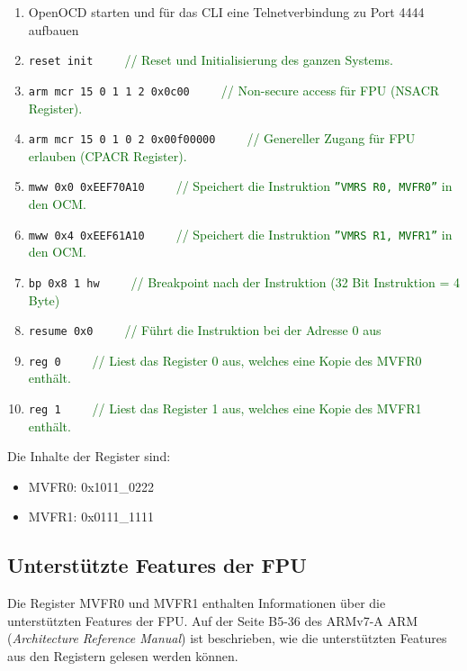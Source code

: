 \begin{enumerate}
\item OpenOCD starten und für das CLI eine Telnetverbindung zu Port 4444 aufbauen
\item \texttt{reset init}\ \ \ \ \ \textcolor{darkgreen}{// Reset und Initialisierung des ganzen Systems.} 
\item \texttt{arm mcr 15 0 1 1 2 0x0c00}\ \ \ \ \ \textcolor{darkgreen}{// Non-secure access für FPU (NSACR Register).} 
\item \texttt{arm mcr 15 0 1 0 2 0x00f00000}\ \ \ \ \ \textcolor{darkgreen}{// Genereller Zugang für FPU erlauben (CPACR Register).} 
\item \texttt{mww 0x0 0xEEF70A10}\ \ \ \ \ \textcolor{darkgreen}{// Speichert die Instruktion \texttt{''VMRS R0, MVFR0''} in den OCM.}
\item \texttt{mww 0x4 0xEEF61A10}\ \ \ \ \ \textcolor{darkgreen}{// Speichert die Instruktion \texttt{''VMRS R1, MVFR1''} in den OCM.}
\item \texttt{bp 0x8 1 hw}\ \ \ \ \ \textcolor{darkgreen}{// Breakpoint nach der Instruktion (32 Bit Instruktion = 4 Byte)}
\item \texttt{resume 0x0}\ \ \ \ \ \textcolor{darkgreen}{// Führt die Instruktion bei der Adresse 0 aus}
\item \texttt{reg 0}\ \ \ \ \ \textcolor{darkgreen}{// Liest das Register 0 aus, welches eine Kopie des MVFR0 enthält.}
\item \texttt{reg 1}\ \ \ \ \ \textcolor{darkgreen}{// Liest das Register 1 aus, welches eine Kopie des MVFR1 enthält.}
\end{enumerate}

Die Inhalte der Register sind:
\begin{itemize}
	\item MVFR0:	0x1011\_0222
	\item MVFR1:	0x0111\_1111
\end{itemize}



\subsection{Unterstützte Features der FPU}
Die Register MVFR0 und MVFR1 enthalten Informationen über die unterstützten Features der FPU.
Auf der Seite B5-36 des ARMv7-A ARM\cite{bib:ARMv7ArchitectureReferenceManual} (\textit{Architecture Reference Manual}) ist beschrieben, wie die unterstützten Features aus den Registern gelesen werden können.

